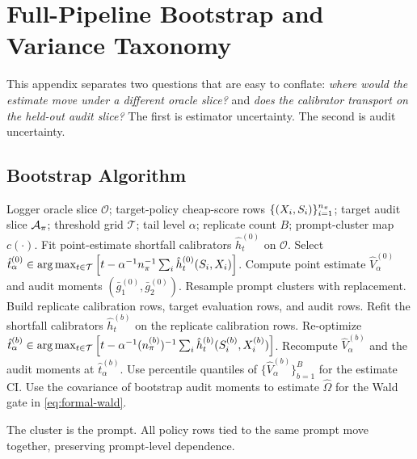 \section{Full-Pipeline Bootstrap and Variance Taxonomy}
\label{app:bootstrap}

This appendix separates two questions that are easy to conflate:
\emph{where would the estimate move under a different oracle slice?} and
\emph{does the calibrator transport on the held-out audit slice?} The first is
estimator uncertainty. The second is audit uncertainty.

\subsection{Bootstrap Algorithm}

\begin{algorithm}[h]
\caption{Full-pipeline cluster bootstrap for Direct CVaR-CJE}
\label{alg:bootstrap}
\begin{algorithmic}[1]
\REQUIRE Logger oracle slice $\mathcal{O}$; target-policy cheap-score rows
$\{(X_i,S_i)\}_{i=1}^{n_\pi}$; target audit slice
$\mathcal{A}_\pi$; threshold grid $\mathcal{T}$; tail level $\alpha$;
replicate count $B$; prompt-cluster map $c(\cdot)$.
\STATE Fit point-estimate shortfall calibrators $\hat h_t^{(0)}$ on
$\mathcal{O}$.
\STATE Select
$\hat t_\alpha^{(0)}\in\arg\max_{t\in\mathcal{T}}
\left[t-\alpha^{-1}n_\pi^{-1}\sum_i
\hat h_t^{(0)}(S_i,X_i)\right]$.
\STATE Compute point estimate $\hat V_\alpha^{(0)}$ and audit moments
$(\bar g_1^{(0)},\bar g_2^{(0)})$.
\STATE Resample prompt clusters with replacement.
\STATE Build replicate calibration rows, target evaluation rows, and audit rows.
\STATE Refit the shortfall calibrators $\hat h_t^{(b)}$ on the replicate
calibration rows.
\STATE Re-optimize
$\hat t_\alpha^{(b)}\in\arg\max_{t\in\mathcal{T}}
\left[t-\alpha^{-1}(n_\pi^{(b)})^{-1}
\sum_i\hat h_t^{(b)}(S_i^{(b)},X_i^{(b)})\right]$.
\STATE Recompute $\hat V_\alpha^{(b)}$ and the audit moments at
$\hat t_\alpha^{(b)}$.
\ENDFOR
\STATE Use percentile quantiles of $\{\hat V_\alpha^{(b)}\}_{b=1}^B$ for the
estimate CI.
\STATE Use the covariance of bootstrap audit moments to estimate $\hat\Omega$
for the Wald gate in \cref{eq:formal-wald}.
\end{algorithmic}
\end{algorithm}

The cluster is the prompt. All policy rows tied to the same prompt move
together, preserving prompt-level dependence.

